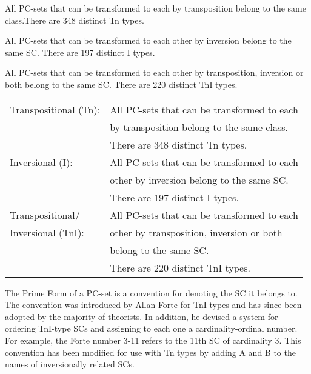 \documentclass{article}
\begin{document}
\begin{description}[style=multiline,leftmargin=2cm,font=\normalfont]
\item[Tn] All PC-sets that can be transformed to each by transposition belong to the same class.There are 348 distinct Tn types.
\item[I] All PC-sets that can be transformed to each other by inversion belong to the same SC. There are 197 distinct I types.
\item[TnI] All PC-sets that can be transformed to each other by transposition, inversion or both belong to the same SC. There are 220 distinct TnI types.
\end{description}


\begin{center}
\begin{tabular}{ll}
 Transpositional (Tn):  &  All PC-sets that can be transformed to each  \\
                        &  by transposition belong to the same class.   \\
                        &  There are 348 distinct Tn types.             \\
 Inversional (I):       &  All PC-sets that can be transformed to each  \\
                        &  other by inversion belong to the same SC.    \\
                        &  There are 197 distinct I types.              \\
 Transpositional/       &  All PC-sets that can be transformed to each  \\
 Inversional (TnI):     &  other by transposition, inversion or both    \\
                        &  belong to the same SC.                       \\
                        &  There are 220 distinct TnI types.            \\
\end{tabular}
\end{center}



The Prime Form of a PC-set is a convention for denoting the SC it
belongs to. The convention was introduced by Allan Forte
\citep{Forte1973} for TnI types and has since been adopted by the
majority of theorists. In addition, he devised a system for ordering
TnI-type SCs and assigning to each one a cardinality-ordinal
number. For example, the Forte number 3-11 refers to the 11th SC of
cardinality 3. This convention has been modified for use with Tn types
by adding A and B to the names of inversionally related SCs.
\end{document}
